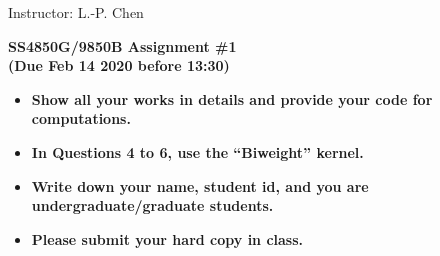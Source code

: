 \documentclass[11pt]{article}
\begin{document}
\hfill Instructor: L.-P. Chen

\begin{center}
\Large{\bf SS4850G/9850B Assignment \#1 
\\(Due Feb 14 2020 before 13:30)}
\end{center}

\begin{itemize}
\item  {\bf Show all your works in details and provide your code for computations.}
\item {\bf In Questions 4 to 6, use the ``Biweight'' kernel.}
\item  {\bf Write down your name, student id, and you are undergraduate/graduate students.}
\item {\bf Please submit your hard copy in class.}
\end{itemize}
\end{document}
